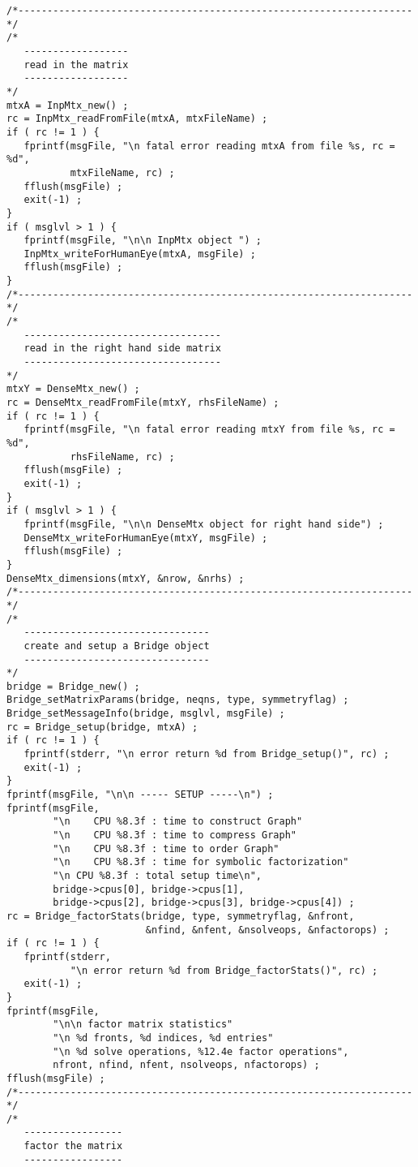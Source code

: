 \begin{verbatim}
/*--------------------------------------------------------------------*/
/*
   ------------------
   read in the matrix
   ------------------
*/
mtxA = InpMtx_new() ;
rc = InpMtx_readFromFile(mtxA, mtxFileName) ;
if ( rc != 1 ) {
   fprintf(msgFile, "\n fatal error reading mtxA from file %s, rc = %d",
           mtxFileName, rc) ;
   fflush(msgFile) ;
   exit(-1) ;
}
if ( msglvl > 1 ) {
   fprintf(msgFile, "\n\n InpMtx object ") ;
   InpMtx_writeForHumanEye(mtxA, msgFile) ;
   fflush(msgFile) ;
}
/*--------------------------------------------------------------------*/
/*
   ----------------------------------
   read in the right hand side matrix
   ----------------------------------
*/
mtxY = DenseMtx_new() ;
rc = DenseMtx_readFromFile(mtxY, rhsFileName) ;
if ( rc != 1 ) {
   fprintf(msgFile, "\n fatal error reading mtxY from file %s, rc = %d",
           rhsFileName, rc) ;
   fflush(msgFile) ;
   exit(-1) ;
}
if ( msglvl > 1 ) {
   fprintf(msgFile, "\n\n DenseMtx object for right hand side") ;
   DenseMtx_writeForHumanEye(mtxY, msgFile) ;
   fflush(msgFile) ;
}
DenseMtx_dimensions(mtxY, &nrow, &nrhs) ;
/*--------------------------------------------------------------------*/
/*
   --------------------------------
   create and setup a Bridge object
   --------------------------------
*/
bridge = Bridge_new() ;
Bridge_setMatrixParams(bridge, neqns, type, symmetryflag) ;
Bridge_setMessageInfo(bridge, msglvl, msgFile) ;
rc = Bridge_setup(bridge, mtxA) ;
if ( rc != 1 ) {
   fprintf(stderr, "\n error return %d from Bridge_setup()", rc) ;
   exit(-1) ;
}
fprintf(msgFile, "\n\n ----- SETUP -----\n") ;
fprintf(msgFile, 
        "\n    CPU %8.3f : time to construct Graph"
        "\n    CPU %8.3f : time to compress Graph"
        "\n    CPU %8.3f : time to order Graph"
        "\n    CPU %8.3f : time for symbolic factorization"
        "\n CPU %8.3f : total setup time\n",
        bridge->cpus[0], bridge->cpus[1],
        bridge->cpus[2], bridge->cpus[3], bridge->cpus[4]) ;
rc = Bridge_factorStats(bridge, type, symmetryflag, &nfront,
                        &nfind, &nfent, &nsolveops, &nfactorops) ;
if ( rc != 1 ) {
   fprintf(stderr,
           "\n error return %d from Bridge_factorStats()", rc) ;
   exit(-1) ;
}
fprintf(msgFile,
        "\n\n factor matrix statistics"
        "\n %d fronts, %d indices, %d entries"
        "\n %d solve operations, %12.4e factor operations",
        nfront, nfind, nfent, nsolveops, nfactorops) ;
fflush(msgFile) ;
/*--------------------------------------------------------------------*/
/*
   -----------------
   factor the matrix
   -----------------

\end{verbatim}
